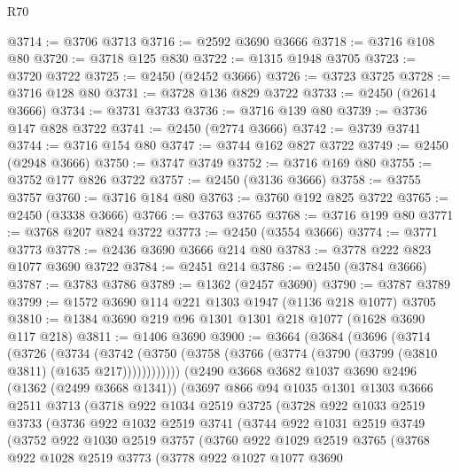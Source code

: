 \begin{lexlean}{R70}
\begin{coremodule}
@3714 := @3706 @3713
@3716 := @2592 @3690 @3666
@3718 := @3716 @108 @80
@3720 := @3718 @125 @830
@3722 := @1315 @1948 @3705
@3723 := @3720 @3722
@3725 := @2450 (@2452 @3666)
@3726 := @3723 @3725
@3728 := @3716 @128 @80
@3731 := @3728 @136 @829 @3722
@3733 := @2450 (@2614 @3666)
@3734 := @3731 @3733
@3736 := @3716 @139 @80
@3739 := @3736 @147 @828 @3722
@3741 := @2450 (@2774 @3666)
@3742 := @3739 @3741
@3744 := @3716 @154 @80
@3747 := @3744 @162 @827 @3722
@3749 := @2450 (@2948 @3666)
@3750 := @3747 @3749
@3752 := @3716 @169 @80
@3755 := @3752 @177 @826 @3722
@3757 := @2450 (@3136 @3666)
@3758 := @3755 @3757
@3760 := @3716 @184 @80
@3763 := @3760 @192 @825 @3722
@3765 := @2450 (@3338 @3666)
@3766 := @3763 @3765
@3768 := @3716 @199 @80
@3771 := @3768 @207 @824 @3722
@3773 := @2450 (@3554 @3666)
@3774 := @3771 @3773
@3778 := @2436 @3690 @3666 @214 @80
@3783 := @3778 @222 @823 @1077 @3690 @3722
@3784 := @2451 @214
@3786 := @2450 (@3784 @3666)
@3787 := @3783 @3786
@3789 := @1362 (@2457 @3690)
@3790 := @3787 @3789
@3799 := @1572 @3690 @114 @221 @1303 @1947 (@1136 @218 @1077) @3705
@3810 := @1384 @3690 @219 @96 @1301 @1301 @218 @1077 (@1628 @3690 @117 @218)
@3811 := @1406 @3690
@3900 := @3664
    (@3684
      (@3696
        (@3714
          (@3726
            (@3734
              (@3742 (@3750 (@3758 (@3766 (@3774 (@3790 (@3799 (@3810 @3811) (@1635 @217))))))))))))
      (@2490
        @3668
        @3682
        @1037
        @3690
        @2496
        (@1362 (@2499 @3668 @1341))
        (@3697
          @866
          @94
          @1035
          @1301
          @1303
          @3666
          @2511
          @3713
          (@3718
            @922
            @1034
            @2519
            @3725
            (@3728
              @922
              @1033
              @2519
              @3733
              (@3736
                @922
                @1032
                @2519
                @3741
                (@3744
                  @922
                  @1031
                  @2519
                  @3749
                  (@3752
                    @922
                    @1030
                    @2519
                    @3757
                    (@3760
                      @922
                      @1029
                      @2519
                      @3765
                      (@3768
                        @922
                        @1028
                        @2519
                        @3773
                        (@3778
                          @922
                          @1027
                          @1077
                          @3690

\end{coremodule}
\end{lexlean}
